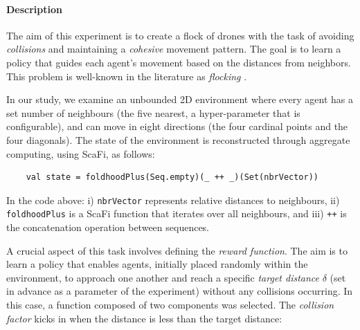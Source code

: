 \documentclass[12pt,a4paper,openright,twoside]{book}
\begin{document}
\paragraph{Description}
The aim of this experiment is to create a flock of drones with the task of avoiding \emph{collisions}
    and maintaining a \emph{cohesive} movement pattern. The goal is to learn a policy that guides each
    agent's movement based on the distances from neighbors.
    This problem is well-known in the literature as \emph{flocking} \cite{DBLP:conf/siggraph/Reynolds87,inverserl}.

In our study, we examine an unbounded 2D environment where every agent has a set number of neighbours 
    (the five nearest, a hyper-parameter that is configurable), and can move in eight directions 
    (the four cardinal points and the four diagonals). The state of the environment is reconstructed 
    through aggregate computing, using ScaFi, as follows:
\begin{lstlisting}
    val state = foldhoodPlus(Seq.empty)(_ ++ _)(Set(nbrVector))
\end{lstlisting}    
In the code above: 
    i) \texttt{nbrVector} represents relative distances to neighbours, 
    ii) \texttt{foldhoodPlus} is a ScaFi function that iterates over all neighbours, and
    iii) \texttt{++} is the concatenation operation between sequences.
 
A crucial aspect of this task involves defining the \emph{reward function}. 
    The aim is to learn a policy that enables agents, initially placed randomly within the environment, 
    to approach one another and reach a specific \emph{target distance} $\delta$ (set in advance as a parameter of the 
    experiment) without any collisions occurring. In this case, a function composed of two components 
    was selected. The \emph{collision factor} kicks in when the distance is less than the target distance:
\end{document}
